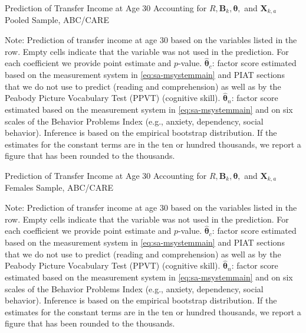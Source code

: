 \begin{table}
\begin{threeparttable}
\caption{Prediction of Transfer Income at Age 30 Accounting for $R, \bm{B}_k, \bm{\theta},$ and $\bm{X}_{k,a}$ Pooled Sample, ABC/CARE}
\label{table:end3}
\centering
\scriptsize

\begin{tablenotes}
\footnotesize
\item Note: Prediction of transfer income at age 30 based on the variables listed in the row. Empty cells indicate that the variable was not used in the prediction. For each coefficient we provide point estimate and $p$-value. $\hat{\bm{\theta}}_{c}$: factor score estimated based on the measurement system in \eqref{eq:sa-msystemmain} and PIAT sections that we do not use to predict (reading and comprehension) as well as by the Peabody Picture Vocabulary Test (PPVT) (cognitive skill). $\hat{\bm{\theta}}_{n}$: factor score estimated based on the measurement system in \eqref{eq:sa-msystemmain} and on six scales of the Behavior Problems Index (e.g., anxiety, dependency, social behavior). Inference is based on the empirical bootstrap distribution. If the estimates for the constant terms are in the ten or hundred thousands, we report a figure that has been rounded to the thousands.
\end{tablenotes}
\end{threeparttable}
\end{table}

\begin{table}
\begin{threeparttable}
\caption{Prediction of Transfer Income at Age 30 Accounting for $R, \bm{B}_k, \bm{\theta},$ and $\bm{X}_{k,a}$ Females Sample, ABC/CARE}
\label{table:end3}
\centering
\scriptsize

\begin{tablenotes}
\footnotesize
\item Note: Prediction of transfer income at age 30 based on the variables listed in the row. Empty cells indicate that the variable was not used in the prediction. For each coefficient we provide point estimate and $p$-value. $\hat{\bm{\theta}}_{c}$: factor score estimated based on the measurement system in \eqref{eq:sa-msystemmain} and PIAT sections that we do not use to predict (reading and comprehension) as well as by the Peabody Picture Vocabulary Test (PPVT) (cognitive skill). $\hat{\bm{\theta}}_{n}$: factor score estimated based on the measurement system in \eqref{eq:sa-msystemmain} and on six scales of the Behavior Problems Index (e.g., anxiety, dependency, social behavior). Inference is based on the empirical bootstrap distribution. If the estimates for the constant terms are in the ten or hundred thousands, we report a figure that has been rounded to the thousands.
\end{tablenotes}
\end{threeparttable}
\end{table}


